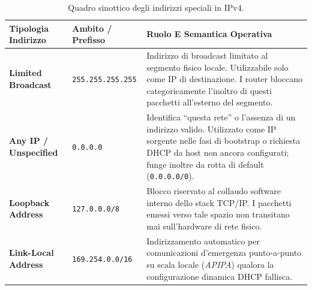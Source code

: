 \documentclass[11pt, a4paper]{article}
\begin{document}
\begin{table}[H]
\centering
\caption{Quadro sinottico degli indirizzi speciali in IPv4.}
\label{tab:special_ip}
\begin{tabularx}{\textwidth}{l l X}
\toprule
\textbf{Tipologia Indirizzo} & \textbf{Ambito / Prefisso} & \textbf{Ruolo E Semantica Operativa} \\
\midrule
\textbf{Limited Broadcast} & \texttt{255.255.255.255} & Indirizzo di broadcast limitato al segmento fisico locale. Utilizzabile solo come IP di destinazione. I router bloccano categoricamente l'inoltro di questi pacchetti all'esterno del segmento. \\
\textbf{Any IP / Unspecified} & \texttt{0.0.0.0} & Identifica ``questa rete'' o l'assenza di un indirizzo valido. Utilizzato come IP sorgente nelle fasi di bootstrap o richiesta DHCP da host non ancora configurati; funge inoltre da rotta di default (\texttt{0.0.0.0/0}). \\
\textbf{Loopback Address} & \texttt{127.0.0.0/8} & Blocco riservato al collaudo software interno dello stack TCP/IP. I pacchetti emessi verso tale spazio non transitano mai sull'hardware di rete fisico. \\
\textbf{Link-Local Address} & \texttt{169.254.0.0/16} & Indirizzamento automatico per comunicazioni d'emergenza punto-a-punto su scala locale (\emph{APIPA}) qualora la configurazione dinamica DHCP fallisca. \\
\bottomrule
\end{tabularx}
\end{table}
\end{document}
